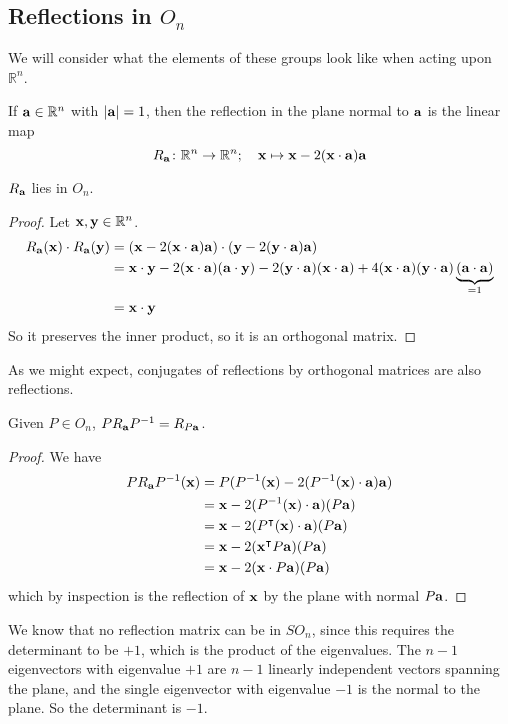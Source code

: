 \subsection{Reflections in \(O_n\)}
We will consider what the elements of these groups look like when acting upon \(\mathbb R^n\).
\begin{definition}
	If \(\vb a \in \mathbb R^n\) with \(\abs{\vb a} = 1\), then the reflection in the plane normal to \(\vb a\) is the linear map
	\[
		R_{\vb a} \colon \mathbb R^n \to \mathbb R^n;\quad \vb x \mapsto \vb x - 2 (\vb x \cdot \vb a) \vb a
	\]
\end{definition}
\begin{lemma}
	\(R_{\vb a}\) lies in \(O_n\).
\end{lemma}
\begin{proof}
	Let \(\vb x, \vb y \in \mathbb R^n\).
	\begin{align*}
		R_{\vb a}(\vb x) \cdot R_{\vb a}(\vb y) & = (\vb x - 2 (\vb x \cdot \vb a) \vb a) \cdot (\vb y - 2 (\vb y \cdot \vb a) \vb a)                                                                                                  \\
		                                        & = \vb x \cdot \vb y - 2(\vb x \cdot \vb a)(\vb a \cdot \vb y) - 2(\vb y\cdot \vb a)(\vb x \cdot \vb a) + 4(\vb x\cdot \vb a)(\vb y \cdot \vb a)\underbrace{(\vb a \cdot \vb a)}_{=1} \\
		                                        & = \vb x \cdot \vb y
	\end{align*}
	So it preserves the inner product, so it is an orthogonal matrix.
\end{proof}
As we might expect, conjugates of reflections by orthogonal matrices are also reflections.
\begin{lemma}
	Given \(P \in O_n\), \(PR_{\vb a}P^{-1} = R_{P\vb a}\).
\end{lemma}
\begin{proof}
	We have
	\begin{align*}
		PR_{\vb a}P^{-1}(\vb x) & = P(P^{-1}(\vb x) - 2 (P^{-1}(\vb x) \cdot \vb a) \vb a) \\
		                        & = \vb x - 2(P^{-1}(\vb x)\cdot\vb a)(P\vb a)             \\
		                        & = \vb x - 2(P^\intercal (\vb x)\cdot\vb a)(P\vb a)      \\
		                        & = \vb x - 2(\vb x^\intercal P \vb a)(P\vb a)            \\
		                        & = \vb x - 2(\vb x \cdot P\vb a)(P\vb a)
	\end{align*}
	which by inspection is the reflection of \(\vb x\) by the plane with normal \(P\vb a\).
\end{proof}
We know that no reflection matrix can be in \(SO_n\), since this requires the determinant to be \(+1\), which is the product of the eigenvalues.
The \(n-1\) eigenvectors with eigenvalue \(+1\) are \(n-1\) linearly independent vectors spanning the plane, and the single eigenvector with eigenvalue \(-1\) is the normal to the plane.
So the determinant is \(-1\).
